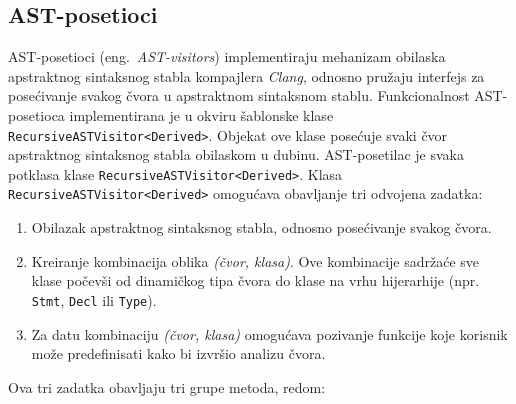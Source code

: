 \documentclass[12pt,oneside]{memoir}
\begin{document}
\subsection{AST-posetioci}
AST-posetioci (eng.~\textit{AST-visitors}) implementiraju mehanizam obilaska apstraktnog sintaksnog stabla kompajlera \textit{Clang}, odnosno pru\v{z}aju interfejs
za pose\'{c}ivanje svakog \v{c}vora u apstraktnom sintaksnom stablu.
Funkcionalnost AST-posetioca implementirana je u okviru šablonske klase  \texttt{RecursiveASTVisitor<Deri\-ved>}.
Objekat ove klase posećuje svaki čvor apstraktnog sintaksnog stabla obilaskom u dubinu.
AST-posetilac je svaka potklasa klase \texttt{RecursiveASTVisitor<Der\-ived>}.
Klasa \texttt{RecursiveASTVisitor<\-Derived>} omogu\'{c}ava obavljanje tri odvojena zadatka:

\begin{enumerate}
\item Obilazak apstraktnog sintaksnog stabla, odnosno pose\'{c}ivanje svakog \v{c}vora.
\item Kreiranje kombinacija oblika \textit{(\v{c}vor, klasa)}. Ove kombinacije sadr\v{z}a\'{c}e sve klase počevši od dinamičkog tipa čvora do klase na vrhu hijerarhije (npr. \texttt{Stmt}, \texttt{Decl} ili \texttt{Type}).
\item Za datu kombinaciju \textit{(čvor, klasa)} omogu\'{c}ava pozivanje funkcije koje korisnik može predefinisati kako bi izvr\v{s}io analizu čvora.
\end{enumerate}
Ova tri zadatka obavljaju tri grupe metoda, redom:
\end{document}
